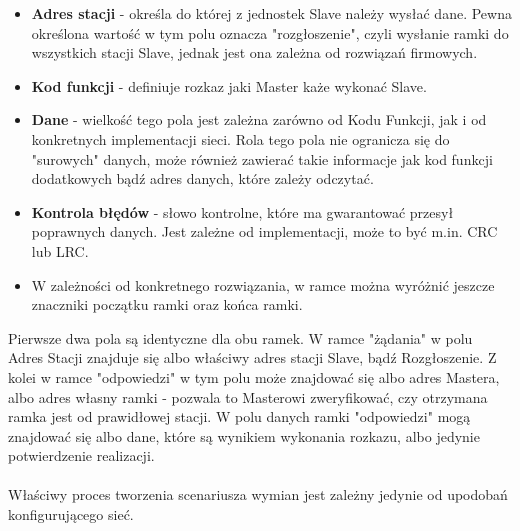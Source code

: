 \documentclass[a4paper,twoside]{article}
\begin{document}
\begin{itemize}
	\item \textbf{Adres stacji} - określa do której z jednostek Slave należy wysłać dane. Pewna określona wartość w tym polu oznacza "rozgłoszenie", czyli wysłanie ramki do wszystkich stacji Slave, jednak jest ona zależna od rozwiązań firmowych.
	\item \textbf{Kod funkcji} - definiuje rozkaz jaki Master każe wykonać Slave.
	\item \textbf{Dane} - wielkość tego pola jest zależna zarówno od Kodu Funkcji, jak i od konkretnych implementacji sieci. Rola tego pola nie ogranicza się do "surowych" danych, może również zawierać takie informacje jak kod funkcji dodatkowych bądź adres danych, które zależy odczytać.
	\item \textbf{Kontrola błędów} - słowo kontrolne, które ma gwarantować przesył poprawnych danych. Jest zależne od implementacji, może to być m.in. CRC lub LRC.
	\item W zależności od konkretnego rozwiązania, w ramce można wyróżnić jeszcze znaczniki początku ramki oraz końca ramki.
\end{itemize}
Pierwsze dwa pola są identyczne dla obu ramek. W ramce "żądania" w polu Adres Stacji znajduje się albo właściwy adres stacji Slave, bądź Rozgłoszenie. Z kolei w ramce "odpowiedzi" w tym polu może znajdować się albo adres Mastera, albo adres własny ramki - pozwala to Masterowi zweryfikować, czy otrzymana ramka jest od prawidłowej stacji. W polu danych ramki "odpowiedzi" mogą znajdować się albo dane, które są wynikiem wykonania rozkazu, albo jedynie potwierdzenie realizacji. \\\\
Właściwy proces tworzenia scenariusza wymian jest zależny jedynie od upodobań konfigurującego sieć.
\end{document}
